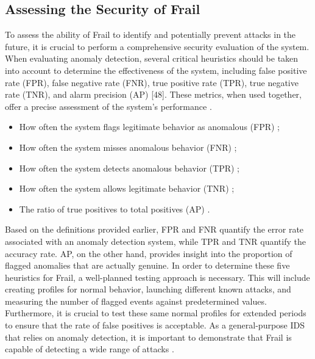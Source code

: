 \documentclass{report}
\begin{document}
\begin{spacing}{1.5}
\section{Assessing the Security of Frail}

{\large
To assess the ability of Frail to identify and potentially prevent attacks in the future, it is crucial to perform a comprehensive security evaluation of the system. When evaluating anomaly detection, several critical heuristics should be taken into account to determine the effectiveness of the system, including false positive rate (FPR), false negative rate (FNR), true positive rate (TPR), true negative rate (TNR), and alarm precision (AP) [48]. These metrics, when used together, offer a precise assessment of the system's performance \cite{findlayugthesis}.
\newline
}

{\large
\begin{itemize}
\item How often the system flags legitimate behavior as anomalous (FPR) \cite{findlayugthesis};
\item How often the system misses anomalous behavior (FNR) \cite{findlayugthesis};
\item How often the system detects anomalous behavior (TPR) \cite{findlayugthesis};
\item How often the system allows legitimate behavior (TNR) \cite{findlayugthesis};
\item The ratio of true positives to total positives (AP) \cite{findlayugthesis}.
\newline
\end{itemize}
}


{\large
\noindent Based on the definitions provided earlier, FPR and FNR quantify the error rate associated with an anomaly detection system, while TPR and TNR quantify the accuracy rate. AP, on the other hand, provides insight into the proportion of flagged anomalies that are actually genuine. In order to determine these five heuristics for Frail, a well-planned testing approach is necessary. This will include creating profiles for normal behavior, launching different known attacks, and measuring the number of flagged events against predetermined values. Furthermore, it is crucial to test these same normal profiles for extended periods to ensure that the rate of false positives is acceptable. As a general-purpose IDS that relies on anomaly detection, it is important to demonstrate that Frail is capable of detecting a wide range of attacks \cite{findlayugthesis}.
\newline
}



\end{spacing}
\end{document}
